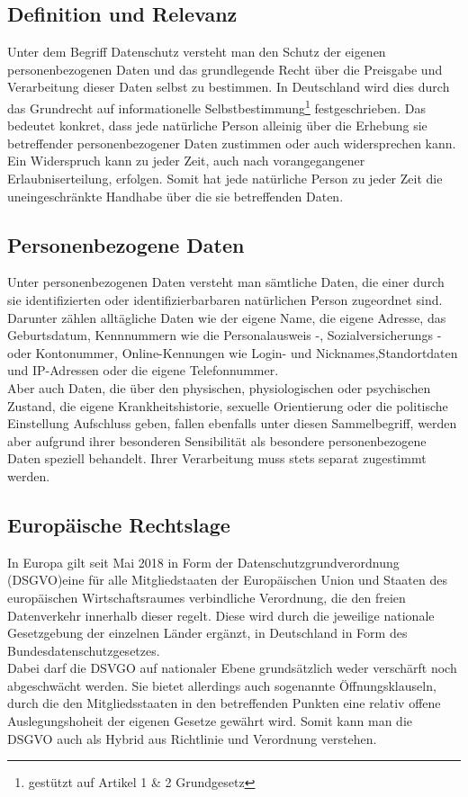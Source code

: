 \subsection{Definition und Relevanz}
Unter dem Begriff Datenschutz versteht man den Schutz der eigenen personenbezogenen Daten und das grundlegende Recht über die Preisgabe und Verarbeitung dieser Daten selbst zu bestimmen. In Deutschland wird dies durch das Grundrecht auf informationelle Selbstbestimmung\footnote{gestützt auf Artikel 1 \& 2 Grundgesetz} festgeschrieben. Das bedeutet konkret, dass jede natürliche Person alleinig über die Erhebung sie betreffender personenbezogener Daten zustimmen oder auch widersprechen kann. Ein Widerspruch kann zu jeder Zeit, auch nach vorangegangener Erlaubniserteilung, erfolgen. Somit hat jede natürliche Person zu jeder Zeit die uneingeschränkte Handhabe über die sie betreffenden Daten.

\subsection{Personenbezogene Daten}
    Unter personenbezogenen Daten versteht man sämtliche Daten, die einer durch sie identifizierten oder identifizierbarbaren natürlichen Person zugeordnet sind. Darunter zählen alltägliche Daten wie der eigene Name, die eigene Adresse, das Geburtsdatum, Kennnummern wie die Personalausweis -, Sozialversicherungs - oder Kontonummer, Online-Kennungen wie Login- und Nicknames,Standortdaten und IP-Adressen oder die eigene Telefonnummer.\\
    Aber auch Daten, die über den physischen, physiologischen oder psychischen Zustand, die eigene Krankheitshistorie, sexuelle Orientierung oder die politische Einstellung Aufschluss geben, fallen ebenfalls unter diesen Sammelbegriff, werden aber aufgrund ihrer besonderen Sensibilität als \glqq besondere personenbezogene Daten\grqq{} speziell behandelt. Ihrer Verarbeitung muss stets separat zugestimmt werden.

\subsection{Europäische Rechtslage}
    In Europa gilt seit Mai 2018 in Form der \glqq Datenschutzgrundverordnung\grqq{} (DSGVO)eine für alle Mitgliedstaaten der Europäischen Union und Staaten des europäischen Wirtschaftsraumes verbindliche Verordnung, die den freien Datenverkehr innerhalb dieser regelt. Diese wird durch die jeweilige nationale Gesetzgebung der einzelnen Länder ergänzt, in Deutschland in Form des Bundesdatenschutzgesetzes.\\
    Dabei darf die DSVGO auf nationaler Ebene grundsätzlich weder verschärft noch abgeschwächt werden. Sie bietet allerdings auch sogenannte Öffnungsklauseln, durch die den Mitgliedsstaaten in den betreffenden Punkten eine relativ offene Auslegungshoheit der eigenen Gesetze gewährt wird. Somit kann man die DSGVO auch als Hybrid aus Richtlinie und Verordnung verstehen.\\

